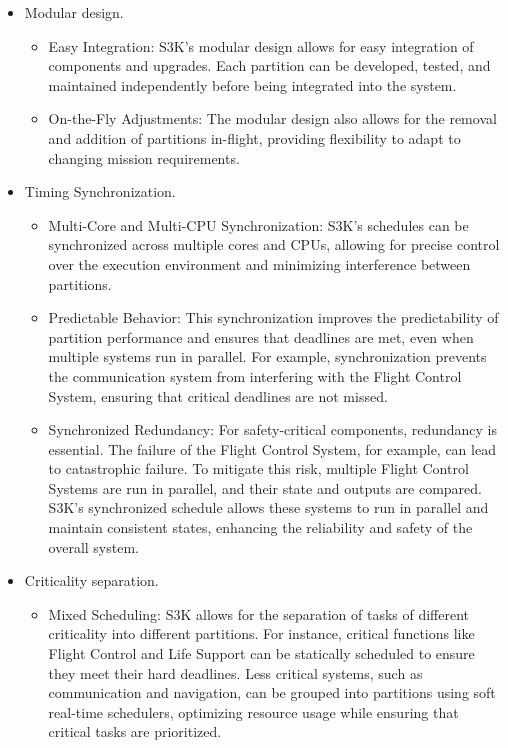 \begin{itemize}
	\item Modular design. 
		\begin{itemize}			
			\item Easy Integration: 
				S3K's modular design allows for easy integration of components and upgrades. 
				Each partition can be developed, tested, and maintained independently before being integrated into the system.
			\item On-the-Fly Adjustments: 
				The modular design also allows for the removal and addition of partitions in-flight, providing flexibility to adapt to changing mission requirements.
		\end{itemize}
	\item Timing Synchronization. 
		\begin{itemize}
			\item Multi-Core and Multi-CPU Synchronization: 
				S3K's schedules can be synchronized across multiple cores and CPUs, allowing for precise control over the execution environment and minimizing interference between partitions.
			\item Predictable Behavior: 
				This synchronization improves the predictability of partition performance and ensures that deadlines are met, even when multiple systems run in parallel. 
				For example, synchronization prevents the communication system from interfering with the Flight Control System, ensuring that critical deadlines are not missed.
			\item Synchronized Redundancy: 
				For safety-critical components, redundancy is essential. 
				The failure of the Flight Control System, for example, can lead to catastrophic failure. 
				To mitigate this risk, multiple Flight Control Systems are run in parallel, and their state and outputs are compared.
				S3K's synchronized schedule allows these systems to run in parallel and maintain consistent states, enhancing the reliability and safety of the overall system.
		\end{itemize}
	\item Criticality separation.
		\begin{itemize}			
			\item Mixed Scheduling: 
				S3K allows for the separation of tasks of different criticality into different partitions. 
				For instance, critical functions like Flight Control and Life Support can be statically scheduled to ensure they meet their hard deadlines.
				Less critical systems, such as communication and navigation, can be grouped into partitions using soft real-time schedulers, optimizing resource usage while ensuring that critical tasks are prioritized.

\end{itemize}
\end{itemize}

